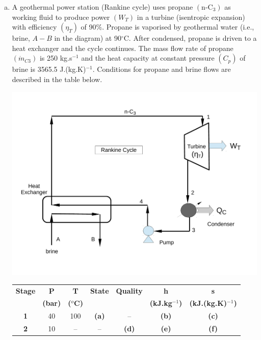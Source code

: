 \documentclass[calculator,steamtables,refrigeranttables,psychrometricchart,datasheet,solutions]{exam}
\begin{document}
\begin{question}
%
\begin{enumerate}[(a)]
\item  A geothermal power station (Rankine cycle) uses propane $\left(\text{n-C}_{3}\right)$ as working fluid to produce power $\left(W_{T}\right)$ in a turbine (isentropic expansion) with efficiency $\left(\eta_{T}\right)$ of 90$\%$. Propane is vaporised by geothermal water (i.e., brine, $A-B$ in the diagram) at 90$^{\circ}$C. After condensed, propane is driven to a heat exchanger and the cycle continues. The mass flow rate of propane $\left(\dot{m}_{C3}\right)$ is 250 kg.s$^{-1}$ and the heat capacity at constant pressure $\left(C_{p}\right)$ of brine is 3565.5 J.(kg.K)$^{-1}$. Conditions for propane and brine flows are described in the table below.
\begin{center}
\includegraphics[width=10.cm,height=7.cm,clip]{./Pics/RankineCycle}
\end{center} 
\begin{center}
\begin{tabular} {||c | c c c c c c || }
\hline\hline
{\bf Stage} & {\bf P}    & {\bf T}        & {\bf State}    &  {\bf Quality }     &  {\bf h}             & {\bf s}                  \\
            & {\bf (bar)}& {\bf ($^{o}$C)} &               &                     & {\bf (kJ.kg$^{-1}$)}  & {\bf (kJ.(kg.K)$^{-1}$)}  \\
\hline\hline
 {\bf 1 }   & 40         & 100            &   {\bf (a)}    &    --               & {\bf (b)}           & {\bf (c)}                \\
 {\bf 2 }   & 10         &  --            &   --           & {\bf (d)}           & {\bf (e)}           & {\bf (f)}                 \\

\end{tabular}
\end{center}
\end{enumerate}
\end{question}
\end{document}
